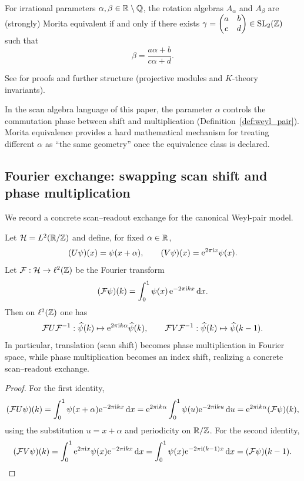 \begin{theorem}
\label{thm:morita_classification_rotation}
\MathTag For irrational parameters $\alpha,\beta\in\mathbb{R}\setminus\mathbb{Q}$, the rotation algebras $A_\alpha$ and $A_\beta$ are (strongly) Morita equivalent if and only if there exists $\gamma=\begin{pmatrix}a&b\\c&d\end{pmatrix}\in \mathrm{SL}_2(\mathbb{Z})$ such that
\[
\beta=\frac{a\alpha+b}{c\alpha+d}.
\]
\end{theorem}
\begin{remark}
See \cite{Rieffel1981,Rieffel1988,Connes1994} for proofs and further structure (projective modules and $K$-theory invariants).
\end{remark}

\AuditTag In the scan algebra language of this paper, the parameter $\alpha$ controls the commutation phase between shift and multiplication (Definition~\ref{def:weyl_pair}).
Morita equivalence provides a hard mathematical mechanism for treating different $\alpha$ as ``the same geometry'' once the equivalence class is declared.

\subsection{Fourier exchange: swapping scan shift and phase multiplication}
\label{subsec:morita_fourier_exchange}

We record a concrete scan--readout exchange for the canonical Weyl-pair model.

\begin{proposition}
\label{prop:fourier_exchange_weyl_pair}
\MathTag Let $\mathcal{H}=L^2(\mathbb{R}/\mathbb{Z})$ and define, for fixed $\alpha\in\mathbb{R}$,
\[
(U\psi)(x)=\psi(x+\alpha),\qquad (V\psi)(x)=\mathrm{e}^{2\pi\mathrm{i} x}\psi(x).
\]
Let $\mathcal{F}:\mathcal{H}\to \ell^2(\mathbb{Z})$ be the Fourier transform
\[
(\mathcal{F}\psi)(k)=\int_0^1 \psi(x)\,\mathrm{e}^{-2\pi\mathrm{i} k x}\,\mathrm{d} x.
\]
Then on $\ell^2(\mathbb{Z})$ one has
\[
\mathcal{F}U\mathcal{F}^{-1}:\widehat\psi(k)\mapsto \mathrm{e}^{2\pi\mathrm{i} k\alpha}\widehat\psi(k),
\qquad
\mathcal{F}V\mathcal{F}^{-1}:\widehat\psi(k)\mapsto \widehat\psi(k-1).
\]
In particular, translation (scan shift) becomes phase multiplication in Fourier space, while phase multiplication becomes an index shift, realizing a concrete scan--readout exchange.
\end{proposition}
\begin{proof}
For the first identity,
\[
(\mathcal{F}U\psi)(k)=\int_0^1 \psi(x+\alpha)\mathrm{e}^{-2\pi\mathrm{i} k x}\,\mathrm{d} x
=\mathrm{e}^{2\pi\mathrm{i} k\alpha}\int_0^1 \psi(u)\mathrm{e}^{-2\pi\mathrm{i} k u}\,\mathrm{d} u
=\mathrm{e}^{2\pi\mathrm{i} k\alpha}(\mathcal{F}\psi)(k),
\]
using the substitution $u=x+\alpha$ and periodicity on $\mathbb{R}/\mathbb{Z}$.
For the second identity,
\[
(\mathcal{F}V\psi)(k)=\int_0^1 \mathrm{e}^{2\pi\mathrm{i} x}\psi(x)\mathrm{e}^{-2\pi\mathrm{i} k x}\,\mathrm{d} x
=\int_0^1 \psi(x)\mathrm{e}^{-2\pi\mathrm{i} (k-1)x}\,\mathrm{d} x
=(\mathcal{F}\psi)(k-1).
\]
\end{proof}


